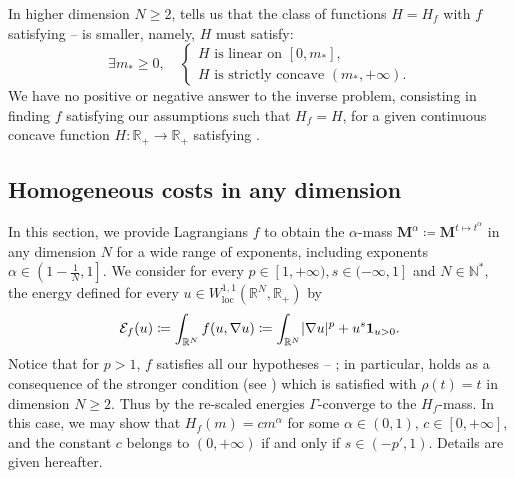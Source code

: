 \documentclass[10pt]{amsart}
\theoremstyle{plain}
\theoremstyle{definition}
\newcommand{\N}{\mathbb{N}}
\newcommand{\R}{\mathbb{R}}
\newcommand{\ener}{\mathcal{E}}
\newcommand{\mass}{\boldsymbol{M}}
\newcommand{\loc}{\mathrm{loc}}
\DeclarePairedDelimiter{\abs}{\lvert}{\rvert}
\begin{document}
In higher dimension \(N\geq 2\),  tells us that the class of functions \(H=H_f\) with \(f\) satisfying -- is smaller, namely, $H$ must satisfy:
\begin{equation}
\label{conditionInverseProblemHigher}
\exists m_\ast\geq 0, \quad
\begin{cases}
H\text{ is linear on }[0,m_\ast],\\
H\text{ is strictly concave }(m_\ast,+\infty).
\end{cases}
\end{equation}
We have no positive or negative answer to the inverse problem, consisting in finding \(f\) satisfying our assumptions such that \(H_f=H\), for a given continuous concave function $H:\R_+\to\R_+$ satisfying .

\subsection{Homogeneous costs in any dimension}\label{homogeneousCosts}

In this section, we provide Lagrangians $f$ to obtain the $\alpha$-mass $\mass^\alpha \coloneqq \mass^{t\mapsto t^\alpha}$ in any dimension $N$ for a wide range of exponents, including exponents $\alpha \in \left(1-\frac 1N,1\right]$. We consider for every $p \in [1,+\infty),s \in (-\infty,1]$ and $N\in \N^\ast$, the energy defined for every $u\in W^{1,1}_{\loc}(\R^N,\R_+)$ by
\begin{equation}\label{energy_homogeneous_case}
\ener_f(u) \coloneqq \int_{\R^N} f(u,\nabla u) \coloneqq \int_{\R^N} \abs{\nabla u}^p + u^s\mathbf{1}_{u>0}.
\end{equation}
Notice that for $p>1$, $f$ satisfies all our hypotheses -- ; in particular,  holds as a consequence of the stronger condition  (see ) which is satisfied with $\rho(t) = t$ in dimension $N\geq 2$. Thus by  the re-scaled energies $\Gamma$-converge to the $H_{f}$-mass. In this case, we may show that $H_f(m)=cm^\alpha$ for some $\alpha\in(0,1)$, $c\in [0, +\infty]$, and the constant $c$ belongs to $(0,+\infty)$ if and only if $s\in (-p',1)$. Details are given hereafter.
\end{document}

